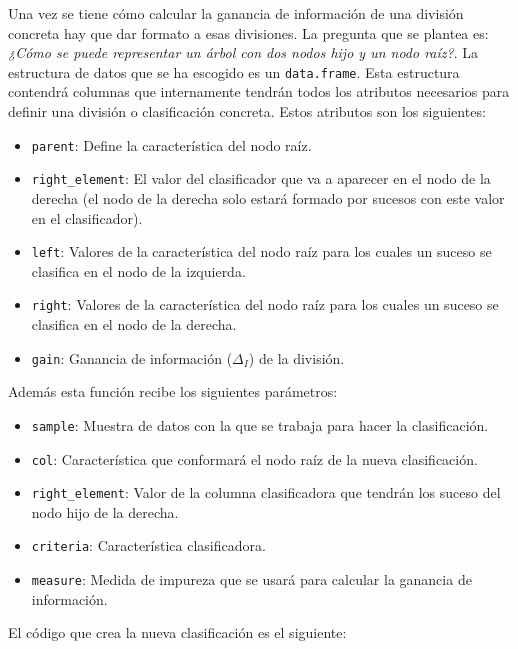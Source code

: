 \documentclass[12pt]{report}\usepackage[]{graphicx}\usepackage[dvipsnames]{xcolor}
\begin{document}
	 			Una vez se tiene cómo calcular la ganancia de información de una división concreta hay que dar formato a esas divisiones. La pregunta que se plantea es: \textit{¿Cómo se puede representar un árbol con dos nodos hijo y un nodo raíz?}. La estructura de datos que se ha escogido es un \texttt{data.frame}. Esta estructura contendrá columnas que internamente tendrán todos los atributos necesarios para definir una división o clasificación concreta. Estos atributos son los siguientes:
	 			
	 			\begin{itemize}
	 				\item \texttt{parent}: Define la característica del nodo raíz.
	 				\item \texttt{right\_element}: El valor del clasificador que va a aparecer en el nodo de la derecha (el nodo de la derecha solo estará formado por sucesos con este valor en el clasificador).
	 				\item \texttt{left}: Valores de la característica del nodo raíz para los cuales un suceso se clasifica en el nodo de la izquierda.
	 				\item \texttt{right}: Valores de la característica del nodo raíz para los cuales un suceso se clasifica en el nodo de la derecha.
	 				\item \texttt{gain}: Ganancia de información ($\Delta_I$) de la división.
	 			\end{itemize}
	 			
	 			
	 			\noindent Además esta función recibe los siguientes parámetros:
	 			
	 			\begin{itemize}
	 				\item \texttt{sample}: Muestra de datos con la que se trabaja para hacer la clasificación.
	 				\item \texttt{col}: Característica que conformará el nodo raíz de la nueva clasificación.
	 				\item \texttt{right\_element}: Valor de la columna clasificadora que tendrán los suceso del nodo hijo de la derecha.
	 				\item \texttt{criteria}: Característica clasificadora.
	 				\item \texttt{measure}: Medida de impureza que se usará para calcular la ganancia de información.
	 			\end{itemize}
	 			
	 			\noindent El código que crea la nueva clasificación es el siguiente:
	 			
\end{document}
